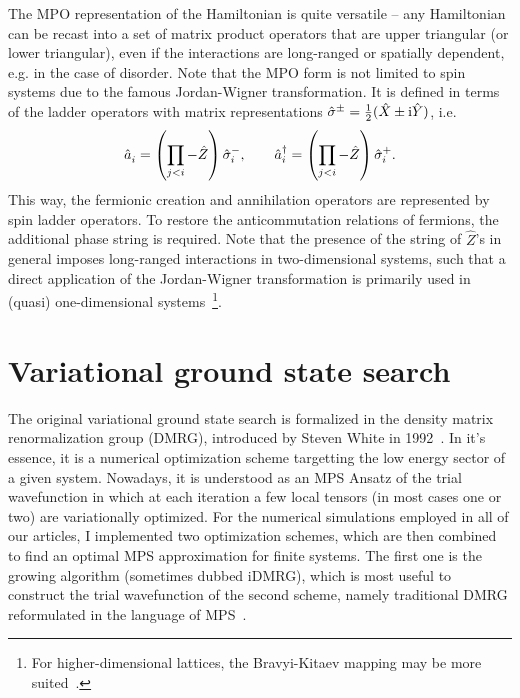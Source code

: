 The MPO representation of the Hamiltonian is quite versatile -- any Hamiltonian can be recast into a set of matrix product operators that are upper triangular (or lower triangular), even if the interactions are long-ranged or spatially dependent, e.g. in the case of disorder.
Note that the MPO form is not limited to spin systems due to the famous Jordan-Wigner transformation.
It is defined in terms of the ladder operators with matrix representations $\hat\sigma^\pm = \frac12(\hat X\pm\mathrm i \hat Y)$, i.e.
\begin{align}
    \hat a_i^\pdag = \brlr{\prod_{j<i}-\hat Z}\hat\sigma^-_i,
    \qquad
    \hat a_i^\dag = \brlr{\prod_{j<i}-\hat Z}\hat\sigma^+_i.
    \label{eq:jordan_wigner_trafo}
\end{align}
This way, the fermionic creation and annihilation operators are represented by spin ladder operators.
To restore the anticommutation relations of fermions, the additional phase string is required.
Note that the presence of the string of $\hat Z$'s in general imposes long-ranged interactions in two-dimensional systems, such that a direct application of the Jordan-Wigner transformation is primarily used in (quasi) one-dimensional systems~\cite{Franchini2017}\footnote{For higher-dimensional lattices, the Bravyi-Kitaev mapping may be more suited~\cite{Bravyi2002}.}.
%
%
\section{Variational ground state search}
\label{sec:variational_ground_state_search}
%
%
The original variational ground state search is formalized in the density matrix renormalization group (DMRG), introduced by Steven White in 1992~\cite{White1992}.
In it's essence, it is a numerical optimization scheme targetting the low energy sector of a given system.
Nowadays, it is understood as an MPS Ansatz of the trial wavefunction in which at each iteration a few local tensors (in most cases one or two) are variationally optimized.
For the numerical simulations employed in all of our articles, I implemented two optimization schemes, which are then combined to find an optimal MPS approximation for finite systems.
The first one is the growing algorithm (sometimes dubbed iDMRG), which is most useful to construct the trial wavefunction of the second scheme, namely traditional DMRG reformulated in the language of MPS~\cite{Schollwoeck2011,Silvi2019}.

